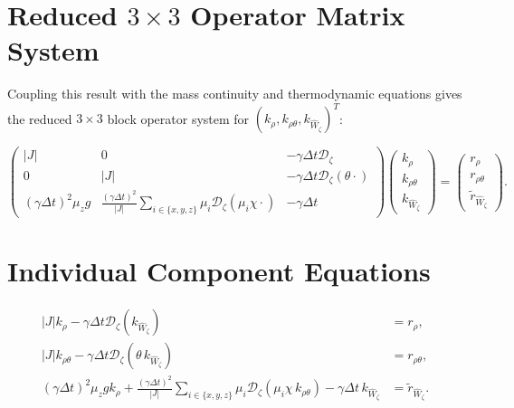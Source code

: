 \documentclass[11pt,a4paper]{article}
\begin{document}
		\section{Reduced $3 \times 3$ Operator Matrix System}
		
		Coupling this result with the mass continuity and thermodynamic equations gives the reduced $3 \times 3$ block operator system for $(k_\rho, k_{\rho \theta}, k_{\widehat{W}_\zeta})^T$:
		
		\begin{equation}
			\begin{pmatrix}
				|J| & 0 & -\gamma \Delta t \mathcal{D}_\zeta \\[12pt]
				0 & |J| & -\gamma \Delta t \mathcal{D}_\zeta (\theta \cdot) \\[12pt]
				(\gamma \Delta t)^2 \mu_z g & \frac{(\gamma \Delta t)^2}{|J|} \sum_{i \in \{x,y,z\}} \mu_i \mathcal{D}_\zeta (\mu_i \chi \cdot) & -\gamma \Delta t
			\end{pmatrix}
			\begin{pmatrix}
				k_\rho \\[12pt]
				k_{\rho \theta} \\[12pt]
				k_{\widehat{W}_\zeta}
			\end{pmatrix}
			=
			\begin{pmatrix}
				r_\rho \\[12pt]
				r_{\rho \theta} \\[12pt]
				\widetilde{r}_{\widehat{W}_\zeta}
			\end{pmatrix}.
		\end{equation}
		
		\section{Individual Component Equations}
		
		\begin{align}
			|J| k_\rho - \gamma \Delta t \mathcal{D}_\zeta \left( k_{\widehat{W}_\zeta} \right) &= r_\rho, \\[8pt]
			|J| k_{\rho \theta} - \gamma \Delta t \mathcal{D}_\zeta \left( \theta \, k_{\widehat{W}_\zeta} \right) &= r_{\rho \theta}, \\[8pt]
			(\gamma \Delta t)^2 \mu_z g k_\rho + \frac{(\gamma \Delta t)^2}{|J|} \sum_{i \in \{x,y,z\}} \mu_i \mathcal{D}_\zeta \left( \mu_i \chi \, k_{\rho \theta} \right) - \gamma \Delta t \, k_{\widehat{W}_\zeta} &= \widetilde{r}_{\widehat{W}_\zeta}.
		\end{align}
\end{document}

